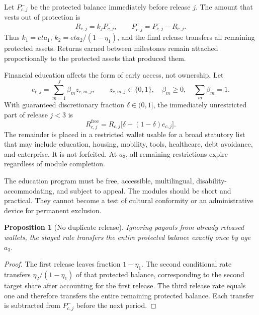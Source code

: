 \documentclass[11pt]{article}
\newtheorem{proposition}[definition]{Proposition}
\begin{document}
Let $P_{c,j}^{-}$ be the protected balance immediately before release $j$. The amount
that vests out of protection is
\begin{equation}
  R_{c,j}=k_jP_{c,j}^{-},
  \qquad
  P_{c,j}^{+}=P_{c,j}^{-}-R_{c,j}.
\end{equation}
Thus $k_1=eta_1$, $k_2=eta_2/(1-\eta_1)$, and the final release transfers all
remaining protected assets. Returns earned between milestones remain attached
proportionally to the protected assets that produced them.

Financial education affects the form of early access, not ownership. Let
\begin{equation}
  e_{c,j}=\sum_{m=1}^{J}\beta_mz_{c,m,j},
  \qquad z_{c,m,j}\in\{0,1\},
  \quad \beta_m\ge0,
  \quad \sum_m\beta_m=1.
\end{equation}
With guaranteed discretionary fraction $\delta\in(0,1]$, the immediately unrestricted
part of release $j<3$ is
\begin{equation}
  R_{c,j}^{\mathrm{free}}
  =R_{c,j}\bigl[\delta+(1-\delta)e_{c,j}\bigr].
\end{equation}
The remainder is placed in a restricted wallet usable for a broad statutory list that
may include education, housing, mobility, tools, healthcare, debt avoidance, and
enterprise. It is not forfeited. At $a_3$, all remaining restrictions expire regardless
of module completion.

The education program must be free, accessible, multilingual, disability-accommodating,
and subject to appeal. The modules should be short and practical. They cannot become a
test of cultural conformity or an administrative device for permanent exclusion.

\begin{proposition}[No duplicate release]
Ignoring payouts from already released wallets, the staged rule transfers the entire
protected balance exactly once by age $a_3$.
\end{proposition}

\begin{proof}
The first release leaves fraction $1-\eta_1$. The second conditional rate transfers
$\eta_2/(1-\eta_1)$ of that protected balance, corresponding to the second target share
after accounting for the first release. The third release rate equals one and therefore
transfers the entire remaining protected balance. Each transfer is subtracted from
$P_{c,j}^{-}$ before the next period.
\end{proof}
\end{document}
